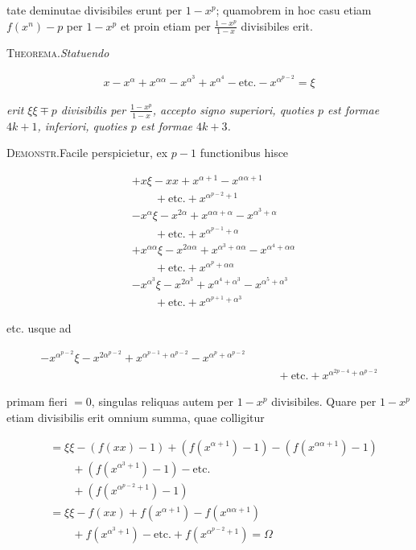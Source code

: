 %
tate deminutae divisibiles erunt per $1-x^p$; quamobrem in hoc casu etiam $f(x^n)-p$ per $1-x^p$ et proin etiam per $\frac{1-x^p}{1-x}$ divisibiles erit.


\textsc{Theorema.}\quad \textit{Statuendo}

\[
\begin{aligned}
x-x^\alpha+x^{\alpha\alpha}-x^{\alpha^3}+x^{\alpha^4}-\text{etc.}-x^{\alpha^{p-2}}=\xi
\end{aligned}
\]

\textit{erit $\xi\xi\mp p$ divisibilis per $\frac{1-x^p}{1-x}$, accepto signo superiori, quoties $p$ est formae} \textit{$4k+1$, inferiori, quoties $p$ est formae $4k+3$.}

\textsc{Demonstr.}\quad Facile perspicietur, ex $p-1$ functionibus hisce

\[
\begin{aligned}
&+x\xi-xx+x^{\alpha+1}-x^{\alpha\alpha+1}\\&\qquad+\text{etc.}+x^{\alpha^{p-2}+1}\\
&-x^\alpha\xi-x^{2\alpha}+x^{\alpha\alpha+\alpha}-x^{\alpha^3+\alpha}\\&\qquad+\text{etc.}+x^{\alpha^{p-1}+\alpha}\\
&+x^{\alpha\alpha}\xi-x^{2\alpha\alpha}+x^{\alpha^3+\alpha\alpha}-x^{\alpha^4+\alpha\alpha}\\&\qquad+\text{etc.}+x^{\alpha^p+\alpha\alpha}\\
&-x^{\alpha^3}\xi-x^{2\alpha^3}+x^{\alpha^4+\alpha^3}-x^{\alpha^5+\alpha^3}\\&\qquad+\text{etc.}+x^{\alpha^{p+1}+\alpha^3}
\end{aligned}
\]

etc. usque ad

\[
\begin{aligned}
-x^{\alpha^{p-2}}\xi-x^{2\alpha^{p-2}}+x^{\alpha^{p-1}+\alpha^{p-2}}-x^{\alpha^p+\alpha^{p-2}}\\&\qquad+\text{etc.}+x^{\alpha^{2p-4}+\alpha^{p-2}}
\end{aligned}
\]

primam fieri $=0$, singulas reliquas autem per $1-x^p$ divisibiles. Quare per $1-x^p$ etiam divisibilis erit omnium summa, quae colligitur

\[
\begin{aligned}
&=\xi\xi-(f(xx)-1)+(f(x^{\alpha+1})-1)-(f(x^{\alpha\alpha+1})-1)\\&\qquad+(f(x^{\alpha^3+1})-1)-\text{etc.}\\
&\qquad+(f(x^{\alpha^{p-2}+1})-1)\\
&=\xi\xi-f(xx)+f(x^{\alpha+1})-f(x^{\alpha\alpha+1})\\&\qquad+f(x^{\alpha^3+1})-\text{etc.}+f(x^{\alpha^{p-2}+1})=\Omega
\end{aligned}
\]

